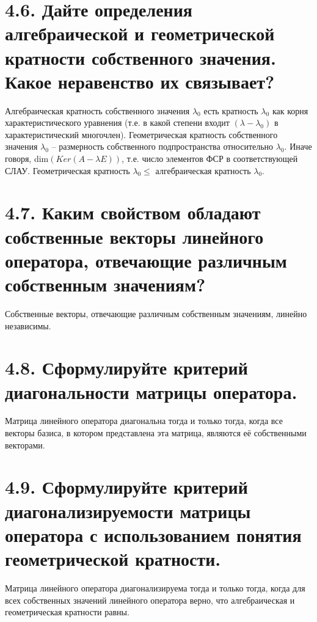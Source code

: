 \documentclass{article}
\begin{document}
\section*{\LARGE 4.6. Дайте определения алгебраической и геометрической кратности собственного значения. Какое неравенство их связывает?}
Алгебраическая кратность собственного значения $\lambda_0$ есть кратность $\lambda_0$ как корня характеристического уравнения (т.е. в какой степени входит $(\lambda - \lambda_0)$ в характеристический многочлен).
\newline Геометрическая кратность собственного значения $\lambda_0$ -- размерность собственного подпространства относительно $\lambda_0$. Иначе говоря, dim$(Ker(A - \lambda E))$, т.е. число элементов ФСР в соответствующей СЛАУ.
\newline Геометрическая кратность $\lambda_0 \le$ алгебраическая кратность $\lambda_0$. 
\section*{\LARGE 4.7. Каким свойством обладают собственные векторы линейного оператора, отвечающие различным собственным значениям?}
Собственные векторы, отвечающие различным собственным значениям, линейно независимы.

\section*{\LARGE 4.8. Сформулируйте критерий диагональности матрицы оператора.}
Матрица линейного оператора диагональна тогда и только тогда, когда все векторы базиса, в котором представлена эта матрица, являются её собственными векторами. 

\section*{\LARGE 4.9. Сформулируйте критерий диагонализируемости матрицы оператора с использованием понятия геометрической кратности.}
Матрица линейного оператора диагонализируема тогда и только тогда, когда для всех собственных значений линейного оператора верно, что алгебраическая и геометрическая кратности равны.
\end{document}
